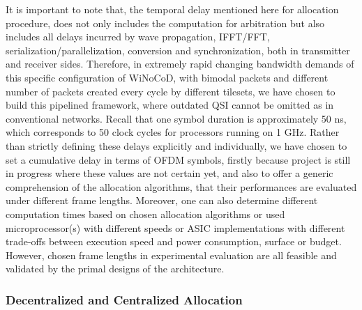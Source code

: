 It is important to note that, the temporal delay mentioned here for allocation procedure, does not only includes the computation for arbitration but also includes all delays incurred by wave propagation, IFFT/FFT, serialization/parallelization, conversion and synchronization, both in transmitter and receiver sides. Therefore, in extremely rapid changing bandwidth demands of this specific configuration of WiNoCoD, with bimodal packets and different number of packets created every cycle by different tilesets, we have chosen to build this pipelined framework, where outdated QSI cannot be omitted as in conventional networks. Recall that one symbol duration is approximately 50 ns, which corresponds to 50 clock cycles for processors running on 1 GHz. Rather than strictly defining these delays explicitly and individually, we have chosen to set a cumulative delay in terms of OFDM symbols, firstly because project is still in progress where these values are not certain yet, and also to offer a generic comprehension of the allocation algorithms, that their performances are evaluated under different frame lengths. Moreover, one can also determine different computation times based on chosen allocation algorithms or used microprocessor(s) with different speeds or ASIC implementations with different trade-offs between execution speed and power consumption, surface or budget. However, chosen frame lengths in experimental evaluation are all feasible and validated by the primal designs of the architecture.  	





\subsubsection{Decentralized and Centralized Allocation}

